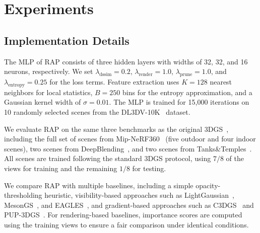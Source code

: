 
\newcommand{\rankone}[1]{\cellcolor{rank1}\textbf{#1}}
\newcommand{\ranktwo}[1]{\cellcolor{rank2}\textbf{#1}}
\newcommand{\rankthree}[1]{\cellcolor{rank3}\textbf{#1}}
\newcommand{\baseline}[1]{\cellcolor{baselinebg}#1}

\section{Experiments}
\label{sec:exp}

\subsection{Implementation Details}
\label{sec:exp_imp}

The MLP of RAP consists of three hidden layers with widths of 32, 32, and 16 neurons, respectively.
We set $\lambda_{\text{dssim}} = 0.2$, $\lambda_{\text{render}} = 1.0$, $\lambda_{\text{prune}} = 1.0$, and $\lambda_{\text{entropy}} = 0.25$ for the loss terms. 
Feature extraction uses $K = 128$ nearest neighbors for local statistics, $B = 250$ bins for the entropy approximation, and a Gaussian kernel width of $\sigma = 0.01$. 
The MLP is trained for 15{,}000 iterations on 10 randomly selected scenes from the DL3DV-10K~\cite{dl3dv} dataset.

We evaluate RAP on the same three benchmarks as the original 3DGS~\cite{3dgs}, including the full set of scenes from Mip-NeRF360~\cite{mip360} (five outdoor and four indoor scenes), two scenes from DeepBlending~\cite{db}, and two scenes from Tanks\&Temples~\cite{tandt}. 
All scenes are trained following the standard 3DGS protocol, using $7/8$ of the views for training and the remaining $1/8$ for testing.

We compare RAP with multiple baselines, including a simple opacity-thresholding heuristic, visibility-based approaches such as LightGaussian~\cite{lightgaussian}, MesonGS~\cite{mesongs}, and EAGLES~\cite{eagles}, and gradient-based approaches such as C3DGS~\cite{c3dgs} and PUP-3DGS~\cite{pup}. 
For rendering-based baselines, importance scores are computed using the training views to ensure a fair comparison under identical conditions.


